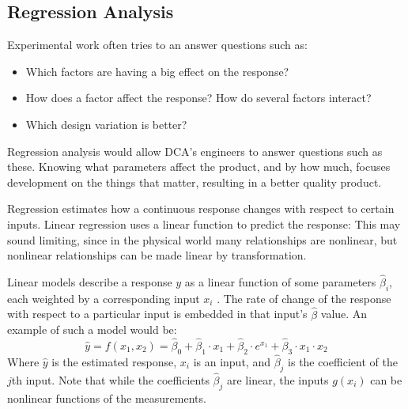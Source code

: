 \documentclass[11pt,a4paper,article]{memoir} %
\begin{document}
\subsection*{Regression Analysis}
Experimental work often tries to an answer questions such as:
\vspace{-10pt}
\begin{itemize}
\item Which factors are having a big effect on the response?
\item How does a factor affect the response? How do several factors interact?
\item Which design variation is better?
\end{itemize}
\vspace{-10pt}
 Regression analysis would allow DCA's engineers to answer questions such as these. Knowing what parameters affect the product, and by how much,  focuses development on the things that matter, resulting in a better quality product.
 \par
 Regression estimates how a continuous response changes with respect to certain inputs. Linear regression uses a linear function to predict the response: This may sound limiting, since in the physical world many relationships are nonlinear, but nonlinear relationships can be made linear by transformation.
\par
  Linear models describe a response $y$ as a linear function of some parameters $\hat{\beta}_i$, each weighted by a corresponding input $x_i$ \cite{faraway2004linear}. The rate of change of the response with respect to a particular input is embedded in that input's $\hat{\beta}$ value. An example of such a model would be:
\begin{equation}
	\hat{y} = f(x_1, x_2) = \hat{\beta}_0 + \hat{\beta}_1 \cdot x_1 + \hat{\beta}_2 \cdot e^{x_1}+ \hat{\beta}_3 \cdot x_1 \cdot x_2
\end{equation}
Where $\hat{y}$ is the estimated response, $x_i$ is an input, and $\hat{\beta}_j$ is the coefficient of the $j$th input. Note that while the coefficients $\hat{\beta}_j$ are linear, the inputs $g(x_i)$ can be nonlinear functions of the measurements.
\end{document}
